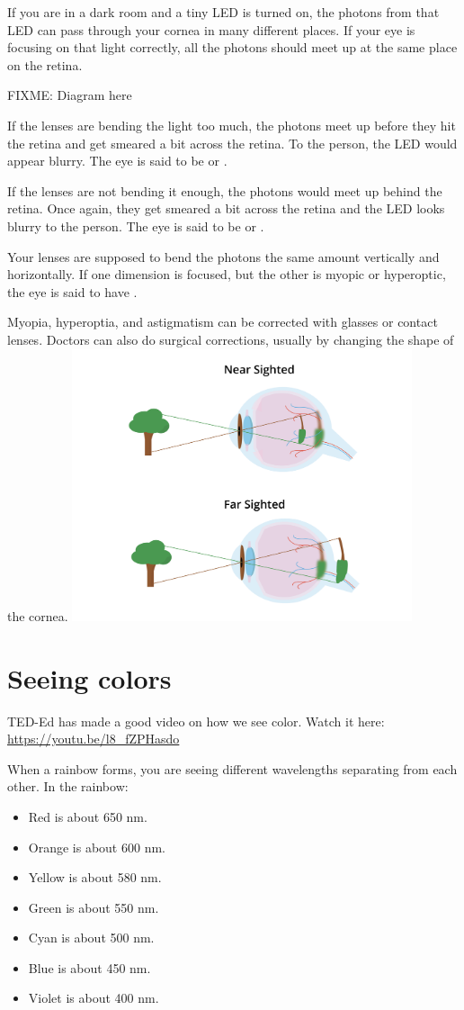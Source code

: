 If you are in a dark room and a tiny LED is turned on, the photons
from that LED can pass through your cornea in many different places.
If your eye is focusing on that light correctly, all the photons
should meet up at the same place on the retina.

FIXME: Diagram here

If the lenses are bending the light too much, the photons meet up before they hit the
retina and get smeared a bit across the retina. To the person, the LED
would appear blurry. The eye is said to be  or
.

If the lenses are not bending it enough, the photons would meet up
behind the retina.  Once again, they get smeared a bit across the
retina and the LED looks blurry to the person. The eye is said to be
 or .

Your lenses are supposed to bend the photons the same amount
vertically and horizontally. If one dimension is focused, but the
other is myopic or hyperoptic, the eye is said to have .

Myopia, hyperoptia, and astigmatism can be corrected with glasses or contact
lenses. Doctors can also do surgical corrections, usually by changing
the shape of the cornea.
\includegraphics[width=0.75\textwidth]{nearfarSight.png}

\section{Seeing colors}

TED-Ed has made a good video on how we see color. Watch it here: \url{https://youtu.be/l8_fZPHasdo}

When a rainbow forms, you are seeing different wavelengths separating from each other. In the rainbow:
\begin{itemize}
\item Red is about 650 nm.
\item Orange is about 600 nm.
\item Yellow is about 580 nm.
\item Green is about 550 nm.
\item Cyan is about 500 nm.
\item Blue is about 450 nm.
\item Violet is about 400 nm.
\end{itemize}

